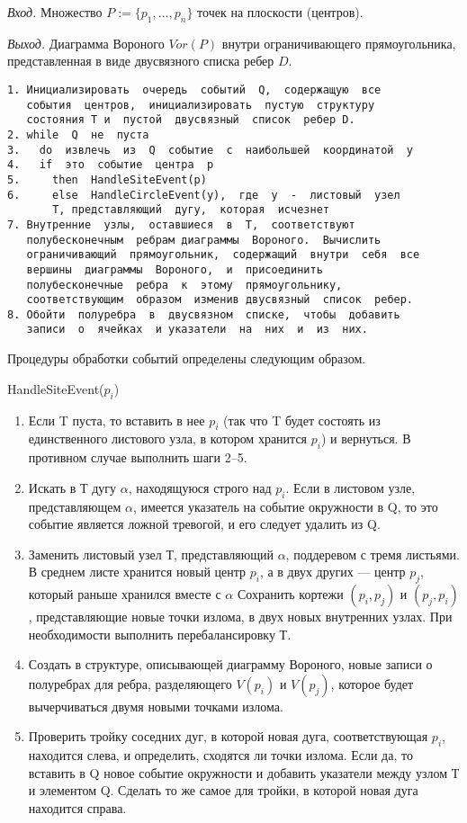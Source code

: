 \textit{Вход.}  Множество  $P :=  \{p_1 , ...,  p_n\}$  точек  на  плоскости  (центров).

\textit{Выход.} Диаграмма  Вороного  $Vor(P)$  внутри  ограничивающего  прямоугольника, представленная  в  виде  двусвязного  списка  ребер $D$.

\begin{verbatim}
1. Инициализировать  очередь  событий  Q,  содержащую  все
   события  центров,  инициализировать  пустую  структуру
   состояния T и  пустой  двусвязный  список  ребер D.
2. while  Q  не  пуста
3.   do  извлечь  из  Q  событие  с  наибольшей  координатой  у
4.   if  это  событие  центра  р
5.     then  HandleSiteEvent(p)
6.     else  HandleCircleEvent(y),  где  у  -  листовый  узел
       Т, представляющий  дугу,  которая  исчезнет
7. Внутренние  узлы,  оставшиеся  в  T,  соответствуют
   полубесконечным  ребрам диаграммы  Вороного.  Вычислить
   ограничивающий  прямоугольник,  содержащий  внутри  себя  все
   вершины  диаграммы  Вороного,  и  присоединить
   полубесконечные  ребра  к  этому  прямоугольнику,
   соответствующим  образом  изменив двусвязный  список  ребер.
8. Обойти  полуребра  в  двусвязном  списке,  чтобы  добавить
   записи  о  ячейках  и указатели  на  них  и  из  них.
\end{verbatim}

Процедуры  обработки  событий  определены  следующим  образом.

HandleSiteEvent($p_i$)

\begin{enumerate}
    \item 	Если  T  пуста,  то  вставить  в  нее  $p_i$ (так  что T будет  состоять  из  единственного листового  узла,  в  котором  хранится  $p_i$)  и  вернуться.
    В  противном  случае  выполнить  шаги  2--5.
    \item 	 Искать  в  Т  дугу  $\alpha$,  находящуюся  строго  над  $p_i$.
    Если  в  листовом  узле,  представляющем  $\alpha$,  имеется  указатель  на  событие  окружности  в  Q,  то  это  событие  является  ложной  тревогой,  и  его  следует  удалить  из  Q.
    \item 	 Заменить  листовый  узел  Т,  представляющий  $\alpha$,  поддеревом  с  тремя  листьями. 
    В  среднем  листе  хранится  новый  центр  $p_i$,  а  в  двух  других  ---  центр  $p_j$,  который раньше  хранился  вместе  с  $\alpha$  Сохранить  кортежи  $(p_i, p_j)$  и  $(p_j, p_i)$,  представляющие  новые  точки  излома,  в  двух  новых  внутренних  узлах.
    При  необходимости выполнить  перебалансировку  Т.
    \item 	 Создать  в  структуре,  описывающей  диаграмму  Вороного,  новые  записи  о  полуребрах  для  ребра,  разделяющего  $V(p_i)$  и  $V(p_j)$,  которое  будет  вычерчиваться двумя  новыми  точками  излома.
    \item 	 Проверить  тройку  соседних  дуг,  в  которой  новая  дуга,  соответствующая  $p_i$,  находится  слева,  и  определить,  сходятся  ли  точки  излома.
    Если  да,  то  вставить  в Q  новое  событие  окружности  и  добавить  указатели  между  узлом  Т  и  элементом Q.  
    Сделать  то  же  самое  для  тройки,  в  которой  новая  дуга  находится  справа.
\end{enumerate}

